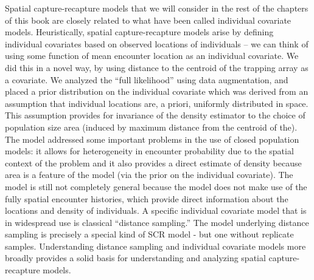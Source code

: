 Spatial capture-recapture models that we will consider in the rest of the chapters of this book are closely related to what have been called individual covariate models. Heuristically, spatial capture-recapture models arise by defining individual covariates based on observed locations of individuals -- we can think of using some function of mean encounter location as an individual covariate. We did this in a novel way, by using distance to the centroid of the trapping array as a covariate. We analyzed the ``full likelihood'' using data augmentation, and placed a prior distribution on the individual covariate which was derived from an assumption that individual locations are, a priori, uniformly distributed in space. This assumption provides for invariance of the density estimator to the choice of population size area (induced by maximum distance from the centroid of the). The model addressed some important problems in the use of closed population models: it allows for heterogeneity in encounter probability due to the spatial context of the problem and it also provides a direct estimate of density because area is a feature of the model (via the prior on the individual covariate). The model is still not completely general because the model does not make use of the fully spatial encounter histories, which provide direct information about the locations and density of individuals.
A specific individual covariate model that is in widespread use is
classical ``distance sampling.'' The model underlying distance sampling is precisely a special kind of SCR model - but one without replicate samples. Understanding distance sampling and individual covariate models more broadly provides a solid basis for understanding and analyzing spatial capture-recapture models. 


